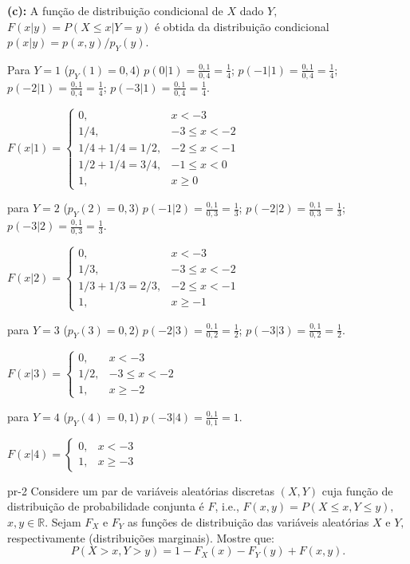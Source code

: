 {{\bf (c):} A função de distribuição condicional de $X$ dado $Y,$ $F(x|y) = P(X \le x | Y=y)$ é obtida da distribuição condicional $p(x|y) = p(x,y)/p_Y(y)$.

Para $Y = 1$ ($p_Y(1)=0,4$)
$p(0|1) = \frac{0,1}{0,4} = \frac{1}{4}$; $p(-1|1) = \frac{0,1}{0,4} = \frac{1}{4}$; $p(-2|1) = \frac{0,1}{0,4} = \frac{1}{4}$; $p(-3|1) = \frac{0,1}{0,4} = \frac{1}{4}$.

$F(x|1) = \begin{cases}
	0, & x < -3 \\ 1/4, & -3 \le x < -2 \\ 1/4+1/4 = 1/2, & -2 \le x < -1 \\ 1/2+1/4 = 3/4, & -1 \le x < 0 \\ 1, & x \ge 0
\end{cases}$

para $Y = 2$ ($p_Y(2)=0,3$)
$p(-1|2)=\frac{0,1}{0,3}=\frac{1}{3}$; $p(-2|2)=\frac{0,1}{0,3}=\frac{1}{3}$; $p(-3|2)=\frac{0,1}{0,3}=\frac{1}{3}$.

$F(x|2) = \begin{cases}
	0, & x < -3 \\ 1/3, & -3 \le x < -2 \\ 1/3+1/3=2/3, & -2 \le x < -1 \\ 1, & x \ge -1
\end{cases}$

para $Y = 3$ ($p_Y(3)=0,2$)
$p(-2|3)=\frac{0,1}{0,2}=\frac{1}{2}$; $p(-3|3)=\frac{0,1}{0,2}=\frac{1}{2}$.

$F(x|3) = \begin{cases}
	0, & x < -3 \\ 1/2, & -3 \le x < -2 \\ 1, & x \ge -2
\end{cases}$

para  $Y = 4$ ($p_Y(4)=0,1$)
$p(-3|4)=\frac{0,1}{0,1}=1$.

$F(x|4) = \begin{cases}
	0, & x < -3 \\
	1, & x \ge -3
\end{cases}$

}





\begin{problema}{}{pr-2}
	Considere um par de variáveis aleatórias discretas $(X, Y)$ cuja função de distribuição de probabilidade conjunta é $F$, i.e., $F(x,y)=P(X\leq x, Y\leq y),$ $x,y \in \mathbb{R}.$ Sejam $F_X$ e $F_Y$ as funções de distribuição das variáveis aleatórias $X$ e $Y,$ respectivamente (distribuições marginais). Mostre que: $$P(X>x, Y>y)= 1-F_X(x)-F_Y(y)+F(x,y).$$ 	
\end{problema}

